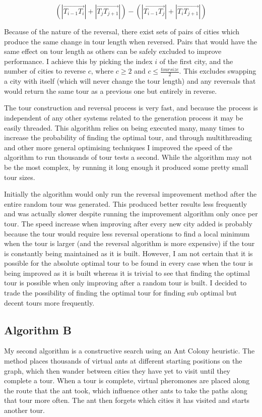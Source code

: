 \documentclass[a4paper,11pt]{article}
\begin{document}
$$(|\overrightarrow{{T_{i-1}}{T_i}}|
+ |\overrightarrow{{T_j}{T_{j+1}}}|)
- (|\overrightarrow{{T_{i-1}}{T_j}}|
+ |\overrightarrow{{T_i}{T_{j+1}}}|)$$

\noindent
Because of the nature of the reversal, there exist sets of pairs of cities
which produce the same change in tour length when reversed. Pairs that would
have the same effect on tour length as others can be safely excluded to improve 
performance. I achieve this by picking the index $i$ of the first city, and the 
number of cities to reverse $c$, where $c \ge 2$ and
$c \le \frac{toursize}{2}$. This excludes swapping a city with itself (which
will never change the tour length) and any reversals that would return the same 
tour as a previous one but entirely in reverse.

The tour construction and reversal process is very fast, and because the
process is independent of any other systems related to the generation process
it may be easily threaded. This algorithm relies on being executed many, many
times to increase the probability of finding the optimal tour, and through
multithreading and other more general optimising techniques I improved the
speed of the algorithm to run thousands of tour tests a second. While the
algorithm may not be the most complex, by running it long enough it produced
some pretty small tour sizes.

Initially the algorithm would only run the reversal improvement method after
the entire random tour was generated. This produced better results less
frequently and was actually slower despite running the improvement algorithm
only once per tour. The speed increase when improving after every new city
added is probably because the tour would require less reversal operations to
find a local minimum when the tour is larger (and the reversal algorithm is more
expensive) if the tour is constantly being maintained as it is built. However,
I am not certain that it is possible for the absolute optimal tour to be found
in every case when the tour is being improved as it is built whereas it is
trivial to see that finding the optimal tour is possible when only improving
after a random tour is built. I decided to trade the possibility of finding the
optimal tour for finding sub optimal but decent tours more frequently.

\subsection*{Algorithm B}
My second algorithm is a constructive search using an Ant Colony heuristic.
The method places thousands of virtual ants at different starting positions on
the graph, which then wander between cities they have yet to visit until they
complete a tour. When a tour is complete, virtual pheromones are placed along
the route that the ant took, which influence other ants to take the paths along
that tour more often. The ant then forgets which cities it has visited and
starts another tour.
\end{document}
